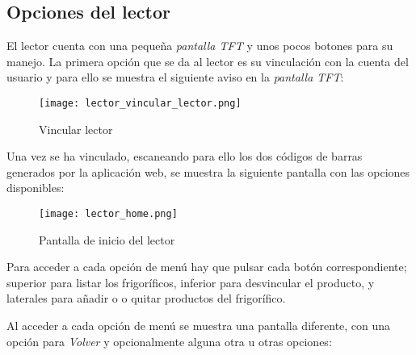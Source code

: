 \subsection{Opciones del lector}

El lector cuenta con una pequeña \emph{pantalla TFT} y unos pocos botones para su manejo. La primera opción que se da al lector es su vinculación con la cuenta del usuario y para ello se muestra el siguiente aviso en la \emph{pantalla TFT}:

\begin{figure}[h!]
    \centering
    \texttt{[image: lector\_vincular\_lector.png]}
    \caption{Vincular lector}\label{fig:lector_vincular_lector}
\end{figure}

Una vez se ha vinculado, escaneando para ello los dos códigos de barras generados por la aplicación web, se muestra la siguiente pantalla con las opciones disponibles:

\begin{figure}[h!]
    \centering
    \texttt{[image: lector\_home.png]}
    \caption{Pantalla de inicio del lector}\label{fig:lector_home}
\end{figure}

Para acceder a cada opción de menú hay que pulsar cada botón correspondiente; superior para listar los frigoríficos, inferior para desvincular el producto, y laterales para añadir o o quitar productos del frigorífico.

Al acceder a cada opción de menú se muestra una pantalla diferente, con una opción para \emph{Volver} y opcionalmente alguna otra u otras opciones:

